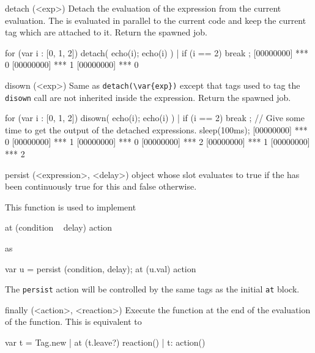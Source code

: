 \begin{urbiscriptapi}

\item[detach](<exp>)%
  Detach the evaluation of the expression  from the current
  evaluation.  The  is evaluated in parallel to the current code
  and keep the current tag which are attached to it.
  Return the spawned job.

\begin{urbiscript}
for (var i : [0, 1, 2])
{
  detach({
    echo(i);
    echo(i)
  }) |
  if (i == 2)
    break
};
[00000000] *** 0
[00000000] *** 1
[00000000] *** 0
\end{urbiscript}

\item[disown](<exp>)%
  Same as \lstinline|detach(\var{exp})| except that tags used to tag
  the \lstinline|disown| call are not inherited inside the expression.
  Return the spawned job.

\begin{urbiscript}
for (var i : [0, 1, 2])
{
  disown({
    echo(i);
    echo(i)
  }) |
  if (i == 2)
    break
};
// Give some time to get the output of the detached expressions.
sleep(100ms);
[00000000] *** 0
[00000000] *** 1
[00000000] *** 0
[00000000] *** 2
[00000000] *** 1
[00000000] *** 2
\end{urbiscript}

\item[persist](<expression>, <delay>)%
  object whose  slot evaluates to true if the
   has been continuously true for this  and
  false otherwise.

  This function is used to implement

\begin{urbiunchecked}
at (condition ~ delay)
  action
\end{urbiunchecked}

  \noindent
  as

\begin{urbiunchecked}
var u = persist (condition, delay);
at (u.val)
  action
\end{urbiunchecked}

  The \lstinline|persist| action will be controlled by the same tags
  as the initial \lstinline|at| block.


\item[finally](<action>, <reaction>)%
  Execute the  function at the end of the evaluation of
  the  function.  This is equivalent to

\begin{urbiunchecked}
{
  var t = Tag.new |
  at (t.leave?)
    reaction() |
  t: action()
}
\end{urbiunchecked}


\end{urbiscriptapi}


